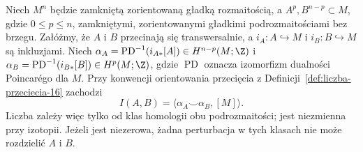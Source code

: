 \begin{twierdzenie}
\label{thm:przeciecie-kubek-16}
Niech $M^n$ będzie zamkniętą zorientowaną gładką
rozmaitością, a $A^p,B^{n-p}\subset M$, gdzie
$0\leq p\leq n$, zamkniętymi, zorientowanymi
gładkimi podrozmaitościami bez brzegu.
Załóżmy, że $A$ i $B$ przecinają się transwersalnie,
a $i_A:A\hookrightarrow M$ i $i_B:B\hookrightarrow M$
są inkluzjami. Niech
$\alpha_A=\operatorname{PD}^{-1}
(i_{A*}[A])\in H^{n-p}(M;\Z)$
i $\alpha_B=\operatorname{PD}^{-1}
(i_{B*}[B])\in H^p(M;\Z)$,
gdzie $\operatorname{PD}$ oznacza izomorfizm
dualności Poincarégo dla $M$.
Przy konwencji orientowania przecięcia
z Definicji~\ref{def:liczba-przeciecia-16}
zachodzi
\begin{equation}\label{eq:przeciecie-kubek-16}
 I(A,B)=
 \langle\alpha_A\smile\alpha_B,[M]\rangle.
\end{equation}
Liczba zależy więc tylko od klas
homologii obu podrozmaitości;
jest niezmienna przy izotopii.
Jeżeli jest niezerowa, żadna
perturbacja w tych klasach nie
może rozdzielić $A$ i $B$.
\end{twierdzenie}
